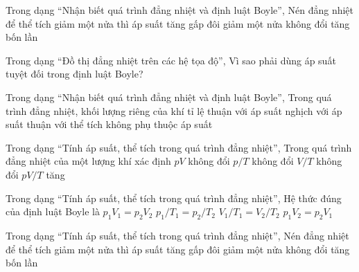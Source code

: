\begin{ex}
Trong dạng “Nhận biết quá trình đẳng nhiệt và định luật Boyle”, Nén đẳng nhiệt để thể tích giảm một nửa thì áp suất
\choice
{\True tăng gấp đôi}
{giảm một nửa}
{không đổi}
{tăng bốn lần}
\end{ex}

\begin{ex}
Trong dạng “Đồ thị đẳng nhiệt trên các hệ tọa độ”, Vì sao phải dùng áp suất tuyệt đối trong định luật Boyle?
\choiceTF

\end{ex}

\begin{ex}
Trong dạng “Nhận biết quá trình đẳng nhiệt và định luật Boyle”, Trong quá trình đẳng nhiệt, khối lượng riêng của khí tỉ lệ
\choice
{\True thuận với áp suất}
{nghịch với áp suất}
{thuận với thể tích}
{không phụ thuộc áp suất}
\end{ex}

\begin{ex}
Trong dạng “Tính áp suất, thể tích trong quá trình đẳng nhiệt”, Trong quá trình đẳng nhiệt của một lượng khí xác định
\choice
{\True $pV$ không đổi}
{$p/T$ không đổi}
{$V/T$ không đổi}
{$pV/T$ tăng}
\end{ex}

\begin{ex}
Trong dạng “Tính áp suất, thể tích trong quá trình đẳng nhiệt”, Hệ thức đúng của định luật Boyle là
\choice
{\True $p_1V_1=p_2V_2$}
{$p_1/T_1=p_2/T_2$}
{$V_1/T_1=V_2/T_2$}
{$p_1V_2=p_2V_1$}
\end{ex}

\begin{ex}
Trong dạng “Tính áp suất, thể tích trong quá trình đẳng nhiệt”, Nén đẳng nhiệt để thể tích giảm một nửa thì áp suất
\choice
{\True tăng gấp đôi}
{giảm một nửa}
{không đổi}
{tăng bốn lần}
\end{ex}

